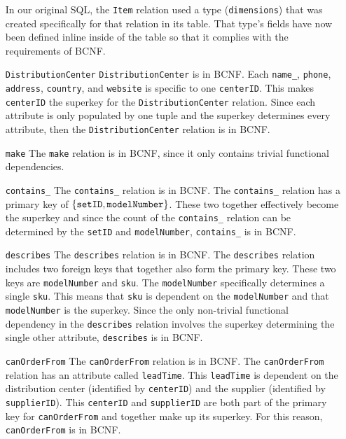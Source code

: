 \documentclass[american,extrafontsizes,12pt,portrait,letterpaper,oneside,onecolumn,article,final]{memoir}
\newcommand*\rnmath[1]{\(\displaystyle #1 \textstyle\)}
\newcommand*{\sqli}[1]{\texttt{#1}}
\newcommand*{\sqlm}[1]{\text{\sqli{#1}}}
\begin{document}
\begin{enumerate}[leftmargin=*,widest={\texttt{DistributionCenter}}]
In our original SQL, the \sqli{Item} relation used a type (\sqli{dimensions}) that was created specifically for that relation in its table.
That type's fields have now been defined inline inside of the table so that it complies with the requirements of BCNF.

\item[\sqli{DistributionCenter}]
\sqli{DistributionCenter} is in BCNF.
Each \sqli{name_}, \sqli{phone}, \sqli{address}, \sqli{country}, and \sqli{website} is specific to one \sqli{centerID}.
This makes \sqli{centerID} the superkey for the \sqli{DistributionCenter} relation.
Since each attribute is only populated by one tuple and the superkey determines every attribute, then the \sqli{DistributionCenter} relation is in BCNF.

\item[\sqli{make}]
The \sqli{make} relation is in BCNF, since it only contains trivial functional dependencies.

\item[\sqli{contains_}]
The \sqli{contains_} relation is in BCNF.
The \sqli{contains_} relation has a primary key of \rnmath{\{\sqlm{setID}, \sqli{modelNumber}\}}.
These two together effectively become the superkey and since the count of the \sqli{contains_} relation can be determined by the \sqli{setID} and \sqli{modelNumber}, \sqli{contains_} is in BCNF.

\item[\sqli{describes}]
The \sqli{describes} relation is in BCNF.
The \sqli{describes} relation includes two foreign keys that together also form the primary key.
These two keys are \sqli{modelNumber} and \sqli{sku}.
The \sqli{modelNumber} specifically determines a single \sqli{sku}.
This means that \sqli{sku} is dependent on the \sqli{modelNumber} and that \sqli{modelNumber} is the superkey. Since the only non\hyp trivial functional dependency in the \sqli{describes} relation involves the superkey determining the single other attribute, \sqli{describes} is in BCNF.

\item[\sqli{canOrderFrom}]
The \sqli{canOrderFrom} relation is in BCNF.
The \sqli{canOrderFrom} relation has an attribute called \sqli{leadTime}.
This \sqli{leadTime} is dependent on the distribution center (identified by \sqli{centerID}) and the supplier (identified by \sqli{supplierID}).
This \sqli{centerID} and \sqli{supplierID} are both part of the primary key for \sqli{canOrderFrom} and together make up its superkey.
For this reason, \sqli{canOrderFrom} is in BCNF.


\end{enumerate}
\end{document}

